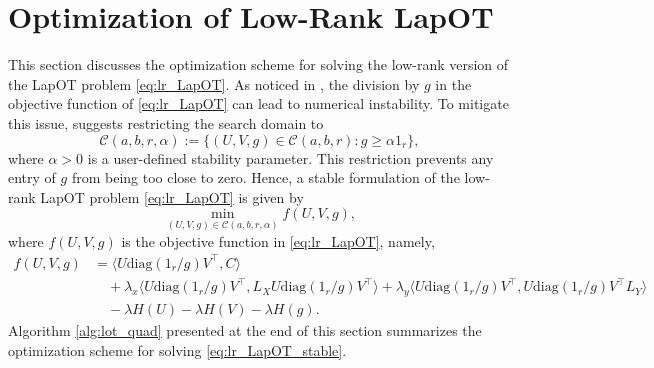 \documentclass{article}
\theoremstyle{definition}
\newcommand{\cC}{\mathcal{C}}
\begin{document}
\section{Optimization of Low-Rank LapOT}
\label{sec:lr_LapOT_optimization}
This section discusses the optimization scheme for solving the low-rank version of the LapOT problem \eqref{eq:lr_LapOT}. As noticed in \cite{scetbon2021low}, the division by $g$ in the objective function of \eqref{eq:lr_LapOT} can lead to numerical instability. To mitigate this issue, \cite{scetbon2021low} suggests restricting the search domain to 
\begin{equation*}
    \cC(a, b, r, \alpha) := \{(U, V, g) \in \cC(a, b, r) : g \ge \alpha 1_r\},
\end{equation*}
where $\alpha > 0$ is a user-defined stability parameter. This restriction prevents any entry of $g$ from being too close to zero. Hence, a stable formulation of the low-rank LapOT problem \eqref{eq:lr_LapOT} is given by
\begin{equation}
    \label{eq:lr_LapOT_stable}
    \min_{(U, V, g) \in \cC(a, b, r, \alpha)} f(U, V, g),
\end{equation}
where $f(U, V, g)$ is the objective function in \eqref{eq:lr_LapOT}, namely,
\begin{equation*}
    \begin{split}
        f(U, V, g) 
        & = \langle U \mathrm{diag}(1_r / g) V^\top, C \rangle \\
        & \quad + \lambda_x \langle U \mathrm{diag}(1_r / g) V^\top, L_X U \mathrm{diag}(1_r / g) V^\top \rangle + \lambda_y \langle U \mathrm{diag}(1_r / g) V^\top, U \mathrm{diag}(1_r / g) V^\top L_Y \rangle \\
        & \quad - \lambda H(U) - \lambda H(V) - \lambda H(g).
    \end{split}
\end{equation*}
Algorithm \ref{alg:lot_quad} presented at the end of this section summarizes the optimization scheme for solving \eqref{eq:lr_LapOT_stable}.
\end{document}
